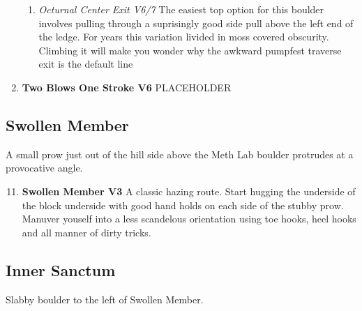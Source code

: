 \begin{multicols*}{2}
\begin{enumerate}[]
\begin{enumerate}
						\item\label{vr:Octurnal Center Exit} \colorbox{Goldenrod!50}{\emph{Octurnal Center Exit V6/7    }  }
						\newline The easiest top option for this boulder involves pulling through a suprisingly good side pull above the left end of the ledge. For years this variation livided in moss covered obscurity. Climbing it will make you wonder why the awkward pumpfest traverse exit is the default line\
					\end{enumerate}
					\setcounter{enumi}{9}
					\item\label{rt:Two Blows One Stroke} \colorbox{RoyalBlue!20}{\textbf{Two Blows One Stroke V6  } }
					\newline PLACEHOLDER\
				\end{enumerate}

			\subsection*{Swollen Member}\label{bf:Swollen Member}
			A small prow just out of the hill side above the Meth Lab boulder protrudes at a provocative angle.
			
				\begin{enumerate}[]
					\setcounter{enumi}{10}
					\item\label{rt:Swollen Member} \colorbox{green!20}{\textbf{Swollen Member V3    } }
					\newline A classic hazing route. Start hugging the underside of the block underside with good hand holds on each side of the stubby prow. Manuver youself into a less scandelous orientation using toe hooks, heel hooks and  all manner of dirty tricks.\
				\end{enumerate}
			\subsection*{Inner Sanctum}\label{bf:Inner Sanctum}
			Slabby boulder to the left of Swollen Member.
			

\end{multicols*}
